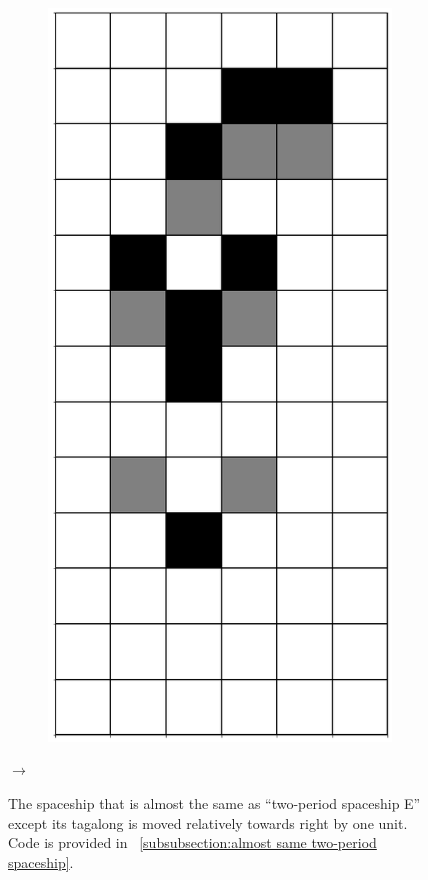 \documentclass[12pt]{article}
\numberwithin{figure}{section} %
\begin{document}
\begin{figure}[H]
\begin{subfigure}{0.3\textwidth}
     		\subcaption{}
   	\end{subfigure}
        \begin{subfigure}{0.3\textwidth}
     		\centering
     		\includegraphics[angle=270,width=\linewidth]{Section4/9.2}
     		\subcaption{}
   	\end{subfigure}
   {\LARGE$\xrightarrow{}$}
   \setcounter{subfigure}{0}
   \caption[Similar two-period spaceship]{The spaceship that is almost the same as “two-period spaceship E” except its tagalong is moved relatively towards right by one unit. Code is provided in ~\ref{subsubsection:almost same two-period spaceship}.}
   \label{fig:almost same two-period spaceship}
   \vspace{-1.5em}
\end{figure}
\end{document}

